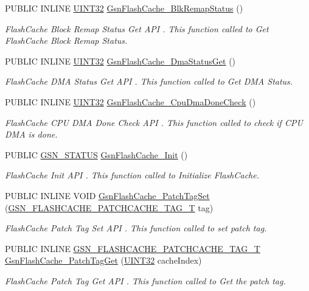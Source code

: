 \begin{DoxyCompactItemize}
PUBLIC INLINE \hyperlink{a00660_gae1e6edbbc26d6fbc71a90190d0266018}{UINT32} \hyperlink{a00646_gab4aea75e2ad9062fc5e173a184b6147d}{GsnFlashCache\_\-BlkRemapStatus} ()
\begin{DoxyCompactList}\small\item\em FlashCache Block Remap Status Get API . This function called to Get FlashCache Block Remap Status. \end{DoxyCompactList}\item 
PUBLIC INLINE \hyperlink{a00660_gae1e6edbbc26d6fbc71a90190d0266018}{UINT32} \hyperlink{a00646_ga4f71563aa7e0fb1d3cc5ca450a509156}{GsnFlashCache\_\-DmaStatusGet} ()
\begin{DoxyCompactList}\small\item\em FlashCache DMA Status Get API . This function called to Get DMA Status. \end{DoxyCompactList}\item 
PUBLIC INLINE \hyperlink{a00660_gae1e6edbbc26d6fbc71a90190d0266018}{UINT32} \hyperlink{a00646_gae01f01a23743ccf476aa0b1fecb59cf6}{GsnFlashCache\_\-CpuDmaDoneCheck} ()
\begin{DoxyCompactList}\small\item\em FlashCache CPU DMA Done Check API . This function called to check if CPU DMA is done. \end{DoxyCompactList}\item 
PUBLIC \hyperlink{a00660_gada5951904ac6110b1fa95e51a9ddc217}{GSN\_\-STATUS} \hyperlink{a00646_gaeb1ae8648522192f59d1c29052fcc20a}{GsnFlashCache\_\-Init} ()
\begin{DoxyCompactList}\small\item\em FlashCache Init API . This function called to Initialize FlashCache. \end{DoxyCompactList}\item 
PUBLIC INLINE VOID \hyperlink{a00646_gacb35895791747971616aabc3efd9942a}{GsnFlashCache\_\-PatchTagSet} (\hyperlink{a00076}{GSN\_\-FLASHCACHE\_\-PATCHCACHE\_\-TAG\_\-T} tag)
\begin{DoxyCompactList}\small\item\em FlashCache Patch Tag Set API . This function called to set patch tag. \end{DoxyCompactList}\item 
PUBLIC INLINE \hyperlink{a00076}{GSN\_\-FLASHCACHE\_\-PATCHCACHE\_\-TAG\_\-T} \hyperlink{a00646_ga36e922df26120cd6c62009c66be2fbb5}{GsnFlashCache\_\-PatchTagGet} (\hyperlink{a00660_gae1e6edbbc26d6fbc71a90190d0266018}{UINT32} cacheIndex)
\begin{DoxyCompactList}\small\item\em FlashCache Patch Tag Get API . This function called to Get the patch tag. \end{DoxyCompactList}\item 

\end{DoxyCompactItemize}
